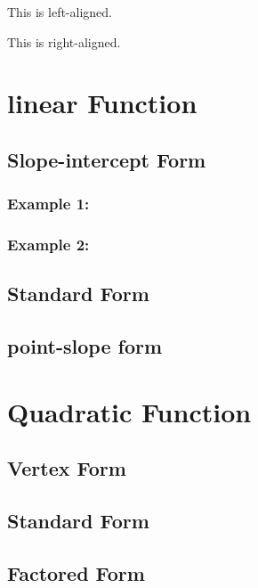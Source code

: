 \documentclass[15pt]{article}
\begin{document}
	\begin{flushleft}
		This is left-aligned.
	\end{flushleft}
	
	\begin{flushright}
		This is right-aligned.
	\end{flushright}
	
	\vspace{3cm}
	
	\section{linear Function}
		\subsection{Slope-intercept Form}
			\subsubsection{Example 1:}
			\subsubsection{Example 2:}
		\subsection{Standard Form}
		\subsection{point-slope form}
	\section{Quadratic Function}
		\subsection{Vertex Form}
		\subsection{Standard Form}
		\subsection{Factored Form}
	
\end{document}
